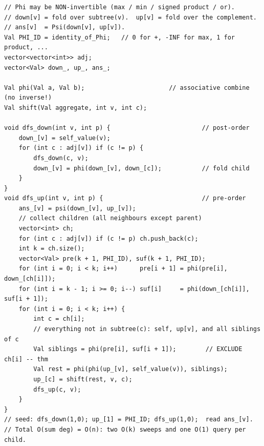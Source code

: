\begin{lstlisting}[caption={Two-DFS rerooting where the sibling aggregate uses prefix/suffix instead of subtraction -- works for any associative Phi, invertible or not.}, label={lst:c20-presuf}]
// Phi may be NON-invertible (max / min / signed product / or).
// down[v] = fold over subtree(v).  up[v] = fold over the complement.
// ans[v]  = Psi(down[v], up[v]).
Val PHI_ID = identity_of_Phi;   // 0 for +, -INF for max, 1 for product, ...
vector<vector<int>> adj;
vector<Val> down_, up_, ans_;

Val phi(Val a, Val b);                       // associative combine (no inverse!)
Val shift(Val aggregate, int v, int c);

void dfs_down(int v, int p) {                         // post-order
    down_[v] = self_value(v);
    for (int c : adj[v]) if (c != p) {
        dfs_down(c, v);
        down_[v] = phi(down_[v], down_[c]);           // fold child
    }
}
void dfs_up(int v, int p) {                           // pre-order
    ans_[v] = psi(down_[v], up_[v]);
    // collect children (all neighbours except parent)
    vector<int> ch;
    for (int c : adj[v]) if (c != p) ch.push_back(c);
    int k = ch.size();
    vector<Val> pre(k + 1, PHI_ID), suf(k + 1, PHI_ID);
    for (int i = 0; i < k; i++)      pre[i + 1] = phi(pre[i], down_[ch[i]]);
    for (int i = k - 1; i >= 0; i--) suf[i]     = phi(down_[ch[i]], suf[i + 1]);
    for (int i = 0; i < k; i++) {
        int c = ch[i];
        // everything not in subtree(c): self, up[v], and all siblings of c
        Val siblings = phi(pre[i], suf[i + 1]);        // EXCLUDE ch[i] -- thm
        Val rest = phi(phi(up_[v], self_value(v)), siblings);
        up_[c] = shift(rest, v, c);
        dfs_up(c, v);
    }
}
// seed: dfs_down(1,0); up_[1] = PHI_ID; dfs_up(1,0);  read ans_[v].
// Total O(sum deg) = O(n): two O(k) sweeps and one O(1) query per child.
\end{lstlisting}

